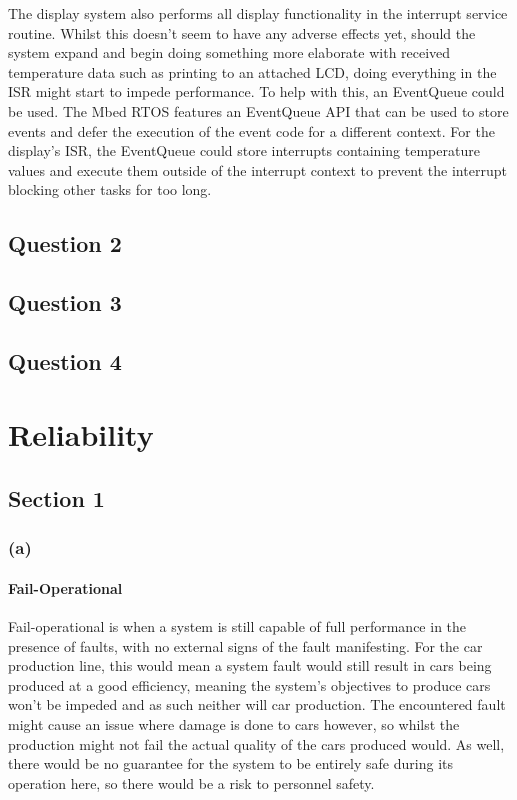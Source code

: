 \documentclass[]{report}
\begin{document}
		The display system also performs all display functionality in the interrupt service routine. Whilst this doesn't seem to have any adverse effects yet, should the system expand and begin doing something more elaborate with received temperature data such as printing to an attached LCD, doing everything in the ISR might start to impede performance. To help with this, an EventQueue could be used. The Mbed RTOS features an EventQueue API\cite{mbedoseventqueue} that can be used to store events and defer the execution of the event code for a different context. For the display's ISR, the EventQueue could store interrupts containing temperature values and execute them outside of the interrupt context to prevent the interrupt blocking other tasks for too long.
			
			
			
		
		
		\section{Question 2}
		\section{Question 3}
		\section{Question 4}
		
	
	
	\chapter{Reliability}
		\section{Section 1}
			\subsection{(a)}
				\subsubsection{Fail-Operational}
				Fail-operational is when a system is still capable of full performance in the presence of faults, with no external signs of the fault manifesting. For the car production line, this would mean a system fault would still result in cars being produced at a good efficiency, meaning the system's objectives to produce cars won't be impeded and as such neither will car production. The encountered fault might cause an issue where damage is done to cars however, so whilst the production might not fail the actual quality of the cars produced would. As well, there would be no guarantee for the system to be entirely safe during its operation here, so there would be a risk to personnel safety.
				
\end{document}
